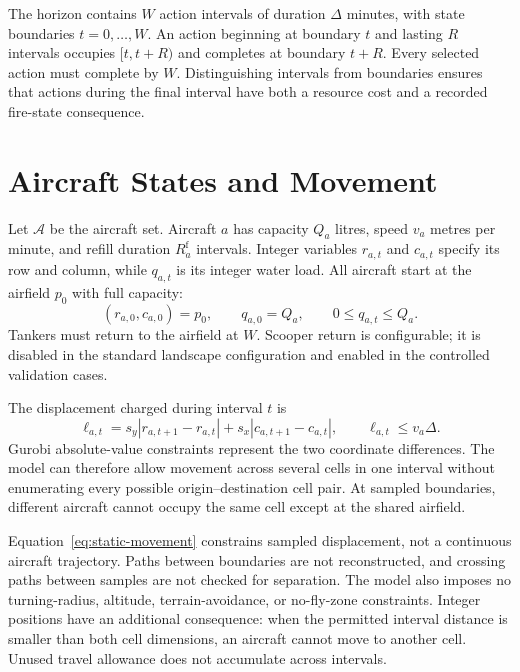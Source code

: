 The horizon contains $W$ action intervals of duration $\Delta$ minutes, with state boundaries $t=0,\ldots,W$. An action beginning at boundary $t$ and lasting $R$ intervals occupies $[t,t+R)$ and completes at boundary $t+R$. Every selected action must complete by $W$. Distinguishing intervals from boundaries ensures that actions during the final interval have both a resource cost and a recorded fire-state consequence.

\section{Aircraft States and Movement}
\label{sec:method-aircraft}

Let $\mathcal{A}$ be the aircraft set. Aircraft $a$ has capacity $Q_a$ litres, speed $v_a$ metres per minute, and refill duration $R_a^{\mathrm{f}}$ intervals. Integer variables $r_{a,t}$ and $c_{a,t}$ specify its row and column, while $q_{a,t}$ is its integer water load. All aircraft start at the airfield $p_0$ with full capacity:
\begin{equation}
    (r_{a,0},c_{a,0})=p_0,
    \qquad q_{a,0}=Q_a,
    \qquad 0\leq q_{a,t}\leq Q_a.
\end{equation}
Tankers must return to the airfield at $W$. Scooper return is configurable; it is disabled in the standard landscape configuration and enabled in the controlled validation cases.

The displacement charged during interval $t$ is
\begin{equation}
    \ell_{a,t}
    =s_y|r_{a,t+1}-r_{a,t}|
    +s_x|c_{a,t+1}-c_{a,t}|,
    \qquad \ell_{a,t}\leq v_a\Delta.
    \label{eq:static-movement}
\end{equation}
Gurobi absolute-value constraints represent the two coordinate differences. The model can therefore allow movement across several cells in one interval without enumerating every possible origin--destination cell pair. At sampled boundaries, different aircraft cannot occupy the same cell except at the shared airfield.

Equation~\eqref{eq:static-movement} constrains sampled displacement, not a continuous aircraft trajectory. Paths between boundaries are not reconstructed, and crossing paths between samples are not checked for separation. The model also imposes no turning-radius, altitude, terrain-avoidance, or no-fly-zone constraints. Integer positions have an additional consequence: when the permitted interval distance is smaller than both cell dimensions, an aircraft cannot move to another cell. Unused travel allowance does not accumulate across intervals.

